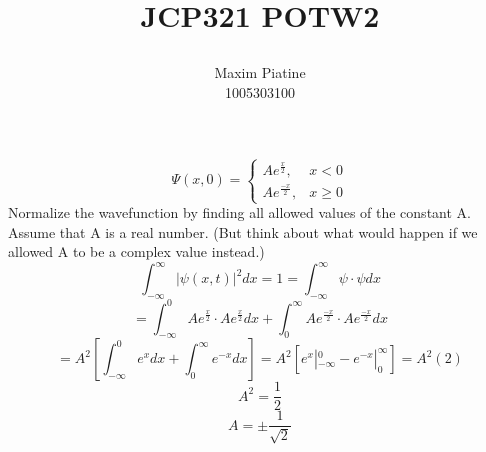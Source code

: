 \documentclass[11pt]{article}
\title{\textbf{JCP321 POTW2}
\author{Maxim Piatine\\1005303100}}
\date{}
\begin{document}
\maketitle
\[ \Psi(x,0)=\begin{cases} 
      Ae^{\frac{x}{2}}, & x < 0 \\
      Ae^{\frac{-x}{2}}, & x\geq 0
   \end{cases}
\]
Normalize the wavefunction by finding all allowed values of the constant A. Assume that A is a real number. (But think about what would happen if we allowed A to be a complex value instead.)
\[\int^\infty_{-\infty}|\psi(x,t)|^2dx=1
=\int^\infty_{-\infty}\psi \cdot \psi dx\]
\[=\int^0_{-\infty}Ae^{\frac{x}{2}} \cdot Ae^{\frac{x}{2}} dx + \int^\infty_{0}Ae^{\frac{-x}{2}} \cdot Ae^{\frac{-x}{2}} dx\]
\[=A^2[\int^0_{-\infty}e^{x} dx + \int^\infty_{0}e^{-x} dx]=
A^2[e^x|^0_{-\infty}-e^{-x}|^\infty_0]=A^2(2)\]
\[A^2=\frac{1}{2}\]
\[A=\pm \frac{1}{\sqrt{2}}\]
\end{document}
